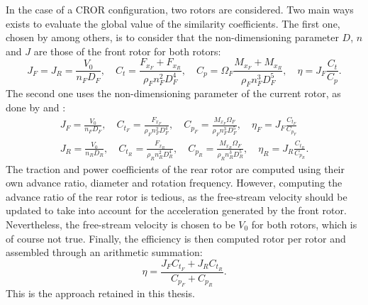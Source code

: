 In the case of a CROR configuration, two rotors are considered.
Two main ways exists to evaluate the global value of the
similarity coefficients. The first one, chosen by
\citet{Bechet2011} among others, is to consider
that the non-dimensioning parameter $D$, $n$ and $J$ are those
of the front rotor for both rotors:
\begin{equation}
    J_F = J_R = \frac{V_0}{n_F D_F}, \quad
    C_t = \frac{F_{x_F} + F_{x_R}}{\rho_F n_F ^ 2  D_F ^ 4}, \quad
    C_p = \Omega_F \frac{M_{x_F} + M_{x_R}}{\rho_F n_F ^ 3 D_F ^ 5}, \quad
    \eta = J_F \frac{C_t}{C_p}.
\end{equation} 
The second one uses the non-dimensioning parameter of the current rotor,
as done by \citet{Stuermer2008} and \citet{Zachariadis2011}:
\begin{equation}
    \begin{split}
        J_F = \frac{V_0}{n_F D_F}, \quad
        C_{t_F} = \frac{F_{x_F}}{\rho_F n_F ^ 2  D_F ^ 4}, \quad
        C_{p_F} = \frac{M_{x_F}\Omega_F}{\rho_F n_F ^ 3 D_F ^ 5}, \quad
        \eta_F = J_F \frac{C_{t_F}}{C_{p_F}} \\
        J_R = \frac{V_0}{n_R D_R}, \quad
        C_{t_R} = \frac{F_{x_R}}{\rho_R n_R ^ 2  D_R ^ 4}, \quad
        C_{p_R} = \frac{M_{x_R}\Omega_F}{\rho_R n_R ^ 3 D_R ^ 5}, \quad
        \eta_R = J_R \frac{C_{t_R}}{C_{p_R}}.
    \end{split}
\end{equation} 
The traction and power coefficients of the rear rotor are
computed using their own advance ratio, diameter and rotation frequency.
However, computing the advance ratio of the rear rotor is tedious, as
the free-stream velocity should be updated to take into account
for the acceleration generated by the front rotor. Nevertheless, the free-stream
velocity is chosen to be $V_0$ for both rotors, which is of course not true.
Finally, the efficiency is then computed rotor per rotor and
assembled through an arithmetic summation:
\begin{equation}
    \eta = \frac{J_F C_{t_F} + J_R C_{t_R}}{C_{p_F} + C_{p_R}}.
\end{equation}
This is the approach retained in this thesis.
